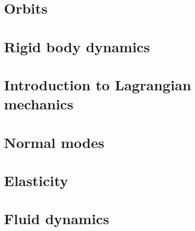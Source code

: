 \documentclass[a4paper]{article}
\begin{document}
\section{Orbits}\label{sec:orbits}
\section{Rigid body dynamics}\label{sec:rigid-body-dynamics}
\section{Introduction to Lagrangian mechanics}\label{sec:introduction-to-lagrangian-mechanics}
\section{Normal modes}\label{sec:normal-modes}
\section{Elasticity}\label{sec:elasticity}
\section{Fluid dynamics}\label{sec:fluid-dynamics}
\end{document}
